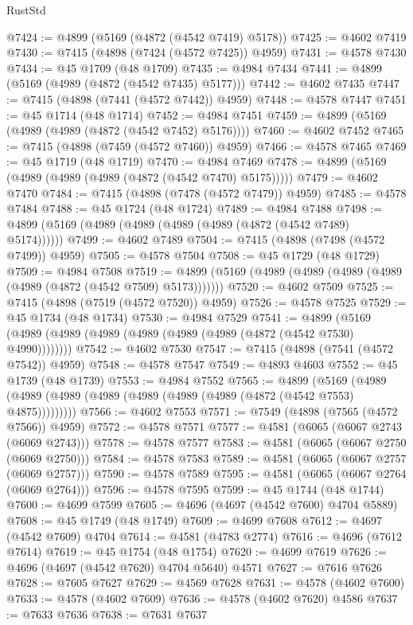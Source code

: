 \begin{lexlean}{RustStd}
\begin{coremodule}
@7424 := @4899 (@5169 (@4872 (@4542 @7419) @5178))
@7425 := @4602 @7419
@7430 := @7415 (@4898 (@7424 (@4572 @7425)) @4959)
@7431 := @4578 @7430
@7434 := @45 @1709 (@48 @1709)
@7435 := @4984 @7434
@7441 := @4899 (@5169 (@4989 (@4872 (@4542 @7435) @5177)))
@7442 := @4602 @7435
@7447 := @7415 (@4898 (@7441 (@4572 @7442)) @4959)
@7448 := @4578 @7447
@7451 := @45 @1714 (@48 @1714)
@7452 := @4984 @7451
@7459 := @4899 (@5169 (@4989 (@4989 (@4872 (@4542 @7452) @5176))))
@7460 := @4602 @7452
@7465 := @7415 (@4898 (@7459 (@4572 @7460)) @4959)
@7466 := @4578 @7465
@7469 := @45 @1719 (@48 @1719)
@7470 := @4984 @7469
@7478 := @4899 (@5169 (@4989 (@4989 (@4989 (@4872 (@4542 @7470) @5175)))))
@7479 := @4602 @7470
@7484 := @7415 (@4898 (@7478 (@4572 @7479)) @4959)
@7485 := @4578 @7484
@7488 := @45 @1724 (@48 @1724)
@7489 := @4984 @7488
@7498 := @4899 (@5169 (@4989 (@4989 (@4989 (@4989 (@4872 (@4542 @7489) @5174))))))
@7499 := @4602 @7489
@7504 := @7415 (@4898 (@7498 (@4572 @7499)) @4959)
@7505 := @4578 @7504
@7508 := @45 @1729 (@48 @1729)
@7509 := @4984 @7508
@7519 := @4899 (@5169 (@4989 (@4989 (@4989 (@4989 (@4989 (@4872 (@4542 @7509) @5173)))))))
@7520 := @4602 @7509
@7525 := @7415 (@4898 (@7519 (@4572 @7520)) @4959)
@7526 := @4578 @7525
@7529 := @45 @1734 (@48 @1734)
@7530 := @4984 @7529
@7541 := @4899 (@5169 (@4989 (@4989 (@4989 (@4989 (@4989 (@4989 (@4872 (@4542 @7530) @4990))))))))
@7542 := @4602 @7530
@7547 := @7415 (@4898 (@7541 (@4572 @7542)) @4959)
@7548 := @4578 @7547
@7549 := @4893 @4603
@7552 := @45 @1739 (@48 @1739)
@7553 := @4984 @7552
@7565 := @4899
    (@5169 (@4989 (@4989 (@4989 (@4989 (@4989 (@4989 (@4989 (@4872 (@4542 @7553) @4875)))))))))
@7566 := @4602 @7553
@7571 := @7549 (@4898 (@7565 (@4572 @7566)) @4959)
@7572 := @4578 @7571
@7577 := @4581 (@6065 (@6067 @2743 (@6069 @2743)))
@7578 := @4578 @7577
@7583 := @4581 (@6065 (@6067 @2750 (@6069 @2750)))
@7584 := @4578 @7583
@7589 := @4581 (@6065 (@6067 @2757 (@6069 @2757)))
@7590 := @4578 @7589
@7595 := @4581 (@6065 (@6067 @2764 (@6069 @2764)))
@7596 := @4578 @7595
@7599 := @45 @1744 (@48 @1744)
@7600 := @4699 @7599
@7605 := @4696 (@4697 (@4542 @7600) @4704 @5889)
@7608 := @45 @1749 (@48 @1749)
@7609 := @4699 @7608
@7612 := @4697 (@4542 @7609) @4704
@7614 := @4581 (@4783 @2774)
@7616 := @4696 (@7612 @7614)
@7619 := @45 @1754 (@48 @1754)
@7620 := @4699 @7619
@7626 := @4696 (@4697 (@4542 @7620) @4704 @5640) @4571
@7627 := @7616 @7626
@7628 := @7605 @7627
@7629 := @4569 @7628
@7631 := @4578 (@4602 @7600)
@7633 := @4578 (@4602 @7609)
@7636 := @4578 (@4602 @7620) @4586
@7637 := @7633 @7636
@7638 := @7631 @7637

\end{coremodule}
\end{lexlean}
